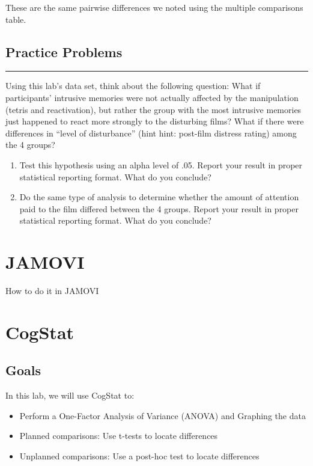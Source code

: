 \documentclass[
]{book}
\begin{document}
These are the same pairwise differences we noted using the multiple comparisons table.

\hypertarget{practice-problems-7}{%
\subsection{Practice Problems}\label{practice-problems-7}}

\begin{center}\rule{0.5\linewidth}{0.5pt}\end{center}

Using this lab's data set, think about the following question: What if participants' intrusive memories were not actually affected by the manipulation (tetris and reactivation), but rather the group with the most intrusive memories just happened to react more strongly to the disturbing films? What if there were differences in ``level of disturbance'' (hint hint: post-film distress rating) among the 4 groups?

\begin{enumerate}
\def\labelenumi{\arabic{enumi}.}
\item
  Test this hypothesis using an alpha level of .05. Report your result in proper statistical reporting format. What do you conclude?
\item
  Do the same type of analysis to determine whether the amount of attention paid to the film differed between the 4 groups. Report your result in proper statistical reporting format. What do you conclude?
\end{enumerate}

\hypertarget{jamovi-8}{%
\section{JAMOVI}\label{jamovi-8}}

How to do it in JAMOVI

\hypertarget{cogstat-9}{%
\section{CogStat}\label{cogstat-9}}

\hypertarget{goals-7}{%
\subsection{Goals}\label{goals-7}}

In this lab, we will use CogStat to:

\begin{itemize}
\item
  Perform a One-Factor Analysis of Variance (ANOVA) and Graphing the data
\item
  Planned comparisons: Use t-tests to locate differences
\item
  Unplanned comparisons: Use a post-hoc test to locate differences
\end{itemize}
\end{document}

